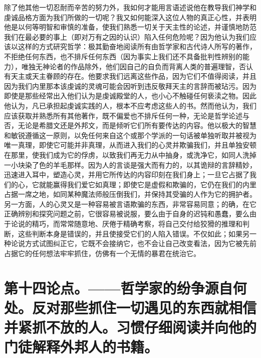 除了他其他一切忍耐而辛苦的努力外，我如何才能用言语述说他在教导我们神学和虔诚品格方面为我们所做的一切呢？我又如何能深入这位人物的真正心性，并表明他是以何等明智和审慎的准备，使我们熟悉一切关于天主性的论述，并谨慎地防范我们在最必要的事上（即对万有之因的认识）陷入任何危险呢？因为他认为我们应该以这样的方式研究哲学：极其勤奋地阅读所有由哲学家和古代诗人所写的著作，不拒绝任何东西，也不排斥任何东西（因为事实上我们还不具备批判性辨别的能力），唯独无神论者的作品除外，他们因自己的自负而背离人类的普遍理智，否认有天主或天主眷顾的存在。他要求我们远离这些作品，因为它们不值得阅读，并且因为我们内里那本该虔诚的灵魂可能会因听到违反敬拜天主的言辞而被玷污。因为即使是那些经常出入他们认为是虔诚殿堂的人，也小心不触碰任何亵渎之物。因此他认为，凡已承担起虔诚实践的人，根本不应考虑这些人的书。然而他认为，我们应该获取并熟悉所有其他著作，既不偏爱也不排斥任何一种，无论是哲学论述与否，无论是希腊文还是外邦文，而是倾听它们所有要传达的内容。他以极大的智慧和敏锐遵循这一原则，以免任何来自这个或那个学派的一句话被单独听取并被视为唯一真理，即使它可能并非真理，从而进入我们的心灵并欺骗我们，并且单独安顿在那里，使我们成为它的俘虏，以致我们再无力从中抽身，或洗净它，如同人洗掉一小块染了色的羊毛那样。因为人的言谈是强大而有力的，以其诡辩的言辞精妙，迅速进入耳中，塑造心灵，并用它所传达的内容印刻在我们身上；一旦它占据了我们的心，它就能赢得我们爱它如真理；即使它是虚假和欺骗的，它仍在我们的内里占据一席之地，如同某种魔法师般压倒我们，并保持其受骗的人作为它的拥护者。另一方面，人的心灵又是一种容易被言语欺骗的东西，非常容易同意；的确，在它正确辨别和探究问题之前，它很容易被说服，要么由于自身的迟钝和愚蠢，要么由于论说的精巧，而常常随意地、厌倦于精确考察，将自己交付给狡猾的推理和判断，这些判断本身是错误的，并且使接受它们的人陷入错误。不仅如此；如果另一种论说方式试图纠正它，它既不会接纳它，也不会让自己改变看法，因为它被先前占据它的任何想法牢牢抓住，仿佛有一个无情的暴君在统治它。\par


\section{第十四论点。——哲学家的纷争源自何处。反对那些抓住一切遇见的东西就相信并紧抓不放的人。习惯仔细阅读并向他的门徒解释外邦人的书籍。}

